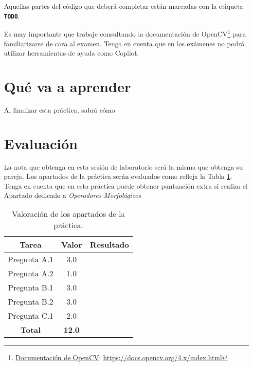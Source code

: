 Aquellas partes del código que deberá completar están marcadas con la etiqueta \textbf{\texttt{TODO}}.

Es muy importante que trabaje consultando la documentación de OpenCV\footnote{\href{https://docs.opencv.org/4.x/index.html}{Documentación de OpenCV}: \url{https://docs.opencv.org/4.x/index.html}} para familiarizarse de cara al examen. Tenga en cuenta que en los exámenes no podrá utilizar herramientas de ayuda como Copilot.

\section{Qué va a aprender}

Al finalizar esta práctica, sabrá cómo 

\section{Evaluación}

La nota que obtenga en esta sesión de laboratorio será la misma que obtenga su pareja. Los apartados de la práctica serán evaluados como refleja la Tabla \ref{table:evaluacion}. Tenga en cuenta que en esta práctica puede obtener puntuación extra si realiza el Apartado dedicado a \textit{Operadores Morfológicos}

\begin{table}[h!]
    \centering
    \begin{tabular}{|c|c|c|}
    \hline
    \textbf{Tarea} & \textbf{Valor} & \textbf{Resultado} \\
    \hline
    Pregunta A.1 & 3.0 & \\
    \hline
    Pregunta A.2 & 1.0 & \\
    \hline
    Pregunta B.1 & 3.0 & \\
    \hline
    Pregunta B.2 & 3.0 & \\
    \hline
    Pregunta C.1 & 2.0 & \\
    \hline
    \textbf{Total} & \textbf{12.0} & \\
    \hline
    \end{tabular}
    \caption{Valoración de los apartados de la práctica.}
    \label{table:evaluacion}
\end{table}
